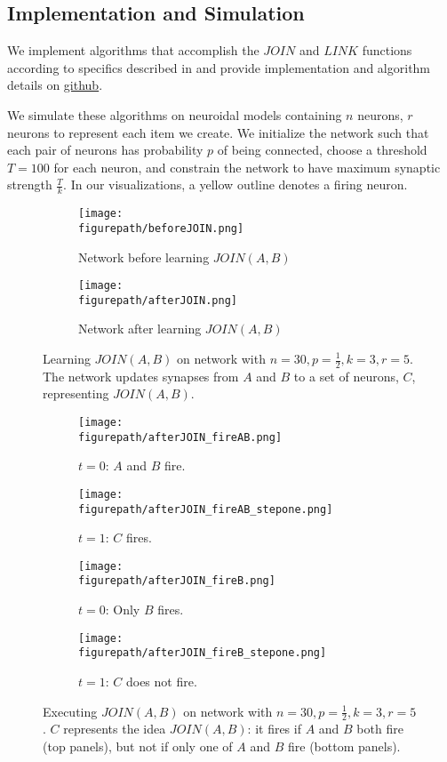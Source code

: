 \documentclass[letterpaper, 12pt]{article}
\newcommand{\figurepath}{../../Figures}
\begin{document}
\subsection{Implementation and Simulation}
We implement algorithms that accomplish the $JOIN$ and $LINK$ functions according to specifics described in \cite{valiant_memorization_2005} and provide implementation and algorithm details on \href{https://github.com/cchen23/neuroidal_model_project/tree/master/Code}{github}.

We simulate these algorithms on neuroidal models containing $n$ neurons, $r$ neurons to represent each item we create. We initialize the network such that each pair of neurons has probability $p$ of being connected, choose a threshold $T=100$ for each neuron, and constrain the network to have maximum synaptic strength $\frac{T}{k}$. In our visualizations, a yellow outline denotes a firing neuron.

\begin{figure}[!htb]
\centering
\begin{subfigure}[b]{0.45\textwidth}
      \texttt{[image: \\figurepath/beforeJOIN.png]}
      \caption*{Network before learning $JOIN(A,B)$}
\end{subfigure}
\begin{subfigure}[b]{0.45\textwidth}
      \texttt{[image: \\figurepath/afterJOIN.png]}
      \caption*{Network after learning $JOIN(A,B)$}
\end{subfigure}
\caption{Learning $JOIN(A,B)$ on network with $n=30,p=\frac{1}{2},k=3,r=5$. The network updates synapses from $A$ and $B$ to a set of neurons, $C$, representing $JOIN(A,B)$.}
\end{figure}

\begin{figure}[!htb]
\centering
\begin{subfigure}[b]{0.45\textwidth}
      \texttt{[image: \\figurepath/afterJOIN\_fireAB.png]}
      \caption*{$t=0$: $A$ and $B$ fire.}
\end{subfigure}
\begin{subfigure}[b]{0.45\textwidth}
      \texttt{[image: \\figurepath/afterJOIN\_fireAB\_stepone.png]}
      \caption*{$t=1$: $C$ fires.}
\end{subfigure}
\begin{subfigure}[b]{0.45\textwidth}
      \texttt{[image: \\figurepath/afterJOIN\_fireB.png]}
      \caption*{$t=0$: Only $B$ fires.}
\end{subfigure}
\begin{subfigure}[b]{0.45\textwidth}
      \texttt{[image: \\figurepath/afterJOIN\_fireB\_stepone.png]}
      \caption*{$t=1$: $C$ does not fire.}
\end{subfigure}
\caption{Executing $JOIN(A,B)$ on network with $n=30,p=\frac{1}{2},k=3,r=5$. $C$ represents the idea $JOIN(A,B)$: it fires if $A$ and $B$ both fire (top panels), but not if only one of $A$ and $B$ fire (bottom panels).}
\end{figure}
\end{document}
